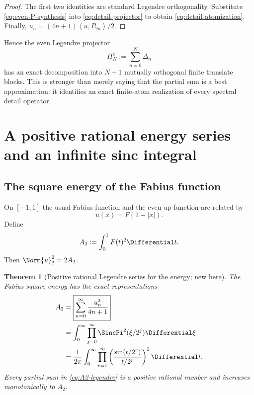 \documentclass[11pt,oneside]{article}
\numberwithin{equation}{section}
\newtheorem{theorem}{Theorem}[section]
\theoremstyle{definition}
\theoremstyle{remark}
\newcommand{\PiE}{\Pi^{\mathrm e}}
\newcommand{\inner}[2]{\left\langle#1,#2\right\rangle}
\begin{document}
\begin{proof}
The first two identities are standard Legendre orthogonality.  Substitute
\eqref{eq:even-P-synthesis} into \eqref{eq:detail-projector} to obtain
\eqref{eq:detail-atomization}.  Finally,
$u_n=(4n+1)\inner{u}{P_{2n}}/2$.
\end{proof}

Hence the even Legendre projector
\begin{equation}
 \PiE_N:=\sum_{n=0}^{N}\Delta_n
 \label{eq:even-projector}
\end{equation}
has an exact decomposition into $N+1$ mutually orthogonal finite translate
blocks.  This is stronger than merely saying that the partial sum is a best
approximation: it identifies an exact finite-atom realization of every
spectral detail operator.

\section{A positive rational energy series and an infinite sinc integral}
\label{sec:energy}

\subsection{The square energy of the Fabius function}

On $[-1,1]$ the usual Fabius function and the even up-function are related by
\begin{equation}
 u(x)=F(1-|x|).
 \label{eq:F-up}
\end{equation}
Define
\begin{equation}
 A_2:=\int_0^1F(t)^2\Differential t.
 \label{eq:A2-def}
\end{equation}
Then $\Norm{u}_2^2=2A_2$.

\begin{theorem}[Positive rational Legendre series for the energy; new here]
\label{thm:A2-series}
The Fabius square energy has the exact representations
\begin{align}
 A_2&=\boxed{\displaystyle\sum_{n=0}^{\infty}\frac{u_n^2}{4n+1}}
 \label{eq:A2-legendre}\\
 &=\int_0^\infty
 \prod_{j=0}^{\infty}\SincPi^2(\xi/2^j)\Differential\xi
 \label{eq:A2-fourier}\\
 &=\frac1{2\pi}\int_0^\infty
 \prod_{r=1}^{\infty}
 \left(\frac{\sin(t/2^r)}{t/2^r}\right)^2\Differential t.
 \label{eq:A2-sinc}
\end{align}
Every partial sum in \eqref{eq:A2-legendre} is a positive rational number and
increases monotonically to $A_2$.
\end{theorem}
\end{document}
